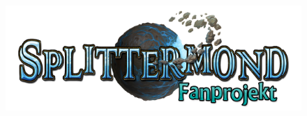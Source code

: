 \documentclass[12pt, a4paper, twoside, openany]{book}
\begin{document}
\begin{titlepage}
        {
            \begin{center}
                    \color{white}
                    \fontsize{50}{60}
                    \selectfont
                    \textbf{\MyTitle}
            \end{center}
       }%
       \begin{figure}[b]
               \centering
               \includegraphics[scale=0.8]{bilder/Splittermond-Logo_fan_v2.png}
       \end{figure}
\end{titlepage}
\clearpage
\end{document}
